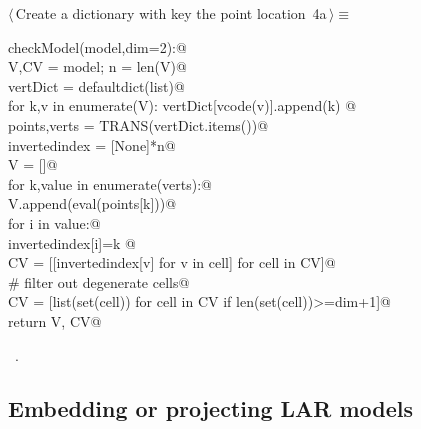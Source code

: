 \documentclass[11pt,oneside]{article}	%
\begin{document}
\begin{flushleft} \small \label{scrap4}
\protect{}$\langle\,$Create a dictionary with key the point location\nobreak\ {\footnotesize 4a}$\,\rangle\equiv$
\vspace{-1ex}
\begin{list}{}{} \item
\mbox{}\verb@def checkModel(model,dim=2):@\\
\mbox{}\verb@   V,CV = model; n = len(V)@\\
\mbox{}\verb@   vertDict = defaultdict(list)@\\
\mbox{}\verb@   for k,v in enumerate(V): vertDict[vcode(v)].append(k) @\\
\mbox{}\verb@   points,verts = TRANS(vertDict.items())@\\
\mbox{}\verb@   invertedindex = [None]*n@\\
\mbox{}\verb@   V = []@\\
\mbox{}\verb@   for k,value in enumerate(verts):@\\
\mbox{}\verb@      V.append(eval(points[k]))@\\
\mbox{}\verb@      for i in value:@\\
\mbox{}\verb@         invertedindex[i]=k   @\\
\mbox{}\verb@   CV = [[invertedindex[v] for v in cell] for cell in CV]@\\
\mbox{}\verb@   # filter out degenerate cells@\\
\mbox{}\verb@   CV = [list(set(cell)) for cell in CV if len(set(cell))>=dim+1]@\\
\mbox{}\verb@   return V, CV@\\
\mbox{}\verb@@{\NWsep}
\end{list}
\vspace{-1ex}
\footnotesize\addtolength{\baselineskip}{-1ex}
\begin{list}{}{\setlength{\itemsep}{-\parsep}\setlength{\itemindent}{-\leftmargin}}
\item \NWtxtMacroRefIn\ .
\end{list}
\end{flushleft}

\subsection{Embedding or projecting LAR models}
\end{document}
